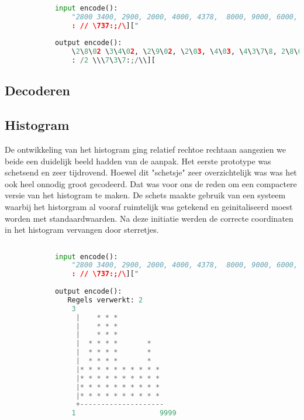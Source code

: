 \documentclass{article}
\begin{document}
       
       \begin{lstlisting}[frame=single, language=python]  % Start your code-block
            
            input encode():
                "2800 3400, 2900, 2000, 4000, 4378,  8000, 9000, 6000, 5689, 3478, 4085, 7095, 1010,1785, 3000,8090
                : // \737:;/\]["
    
            output encode():
                \2\8\02 \3\4\02, \2\9\02, \2\03, \4\03, \4\3\7\8, 2\8\03, \9\03, \6\03, \5\6\8\9, \3\4\7\8, \4\0\8\5, \7\0\9\5, \1\0\1\0,\1\7\8\5, \3\03,\8\0\9\0
                : /2 \\\7\3\7:;/\\][
        \end{lstlisting}
       
    \subsection{Decoderen}
    
        
    
    \subsection{Histogram}
      De ontwikkeling van het histogram ging relatief rechtoe rechtaan aangezien we beide een duidelijk beeld hadden van de aanpak. Het eerste prototype was schetsend en zeer tijdrovend. Hoewel dit "schetsje" zeer overzichtelijk was was het ook heel onnodig groot gecodeerd. Dat was voor ons de reden om een compactere versie van het histogram te maken. De schets maakte gebruik van een systeem waarbij het historgram al vooraf ruimtelijk was getekend en geinitaliseerd moest worden met standaardwaarden. Na deze initiatie werden de correcte coordinaten in het histogram vervangen door sterretjes. 
      \newpage
      \begin{lstlisting}[frame=single, language=python]  % Start your code-block
            
            input encode():
                "2800 3400, 2900, 2000, 4000, 4378,  8000, 9000, 6000, 5689, 3478, 4085, 7095, 1010,1785, 3000,8090
                : // \737:;/\]["
    
            output encode():
               Regels verwerkt: 2
                3
                 |    * * *          
                 |    * * *          
                 |    * * *          
                 |  * * * *       *  
                 |  * * * *       *  
                 |  * * * *       *  
                 |* * * * * * * * * *
                 |* * * * * * * * * *
                 |* * * * * * * * * *
                 |* * * * * * * * * *
                 +--------------------
                1                    9999
        \end{lstlisting}
      
\end{document}
